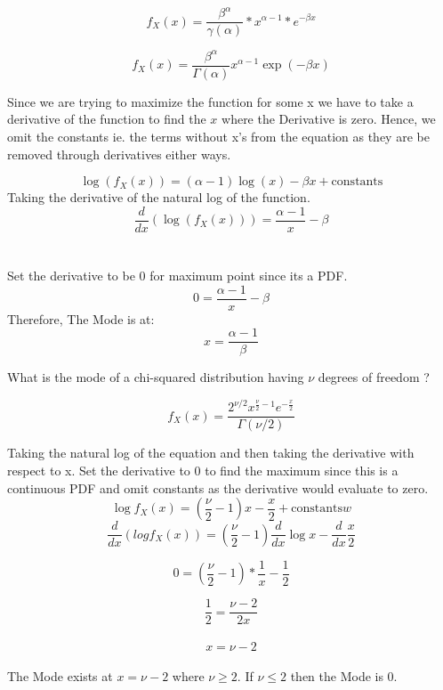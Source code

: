 \documentclass[12pt]{article}
\newenvironment{ex}[2][Exercise]{\begin{trivlist}
\item[\hskip \labelsep {\bfseries #1}\hskip \labelsep {\bfseries #2.}]}{\end{trivlist}}
\newenvironment{sol}[1][Solution]{\begin{trivlist}
\item[\hskip \labelsep {\bfseries #1:}]}{\end{trivlist}}
\begin{document}
\begin{sol}\
\[
f_X(x) = \dfrac{\beta^\alpha}{\gamma(\alpha)} * x^{\alpha-1} * e^{-\beta x}
\]

\[
f_X(x) = \frac{\beta^\alpha}{\Gamma(\alpha)} x^{\alpha-1} \exp(-\beta x)
\]

Since we are trying to maximize the function for some x we have to take a derivative of the function to find the $x$ where the Derivative is zero. Hence, we omit the constants ie. the terms without x's from the equation as they are be removed through derivatives either ways. 

\[
\log(f_X(x)) = (\alpha - 1) \log(x) - \beta x + \text{constants}
\]
Taking the derivative of the natural log of the function.\\
\[
\frac{d}{dx}\left(\log(f_X(x))\right) = \frac{\alpha - 1}{x} - \beta
\]
\\\\
Set the derivative to be 0 for maximum point since its a PDF. 
\[
0 = \frac{\alpha-1}{x} - \beta
\]
Therefore, The Mode is at: 
\[
x = \frac{\alpha -1}{\beta}
\]
\end{sol}
\newpage
\begin{ex}{4.e}
What is the mode of a chi-squared distribution having $\nu$ degrees of freedom ? 
\end{ex}
\begin{sol}
\[
f_X(x) = \frac{2^{\nu/2} x^{\frac{\nu}{2} -1} e^{-\frac{x}{2}}}{\Gamma(\nu/2)}
\]

Taking the natural log of the equation and then taking the derivative with respect to x. Set the derivative to 0 to find the maximum since this is a continuous PDF and omit constants as the derivative would evaluate to zero. 
\[
\log{f_X(x)} = ({\frac{\nu}{2} -1})x - \frac{x}{2} + \text{constants}w
\]
\[
\frac{d}{dx}(log{f_X(x)}) = ({\frac{\nu}{2} -1})\frac{d}{dx} {\log{x}} - \frac{d}{dx}{\frac{x}{2}}
\]

\[
0 = {(\frac{\nu}{2} -1)} * \frac{1}{x} - \frac{1}{2}
\]

\[
\frac{1}{2} = \frac{\nu -2}{2x}
\]
\\ 
\[
x = \nu -2
\]
\\
The Mode exists at $x = \nu -2$ where $\nu \geq 2$. If $\nu \leq 2$ then the Mode is 0.
\end{sol}

\end{document}
